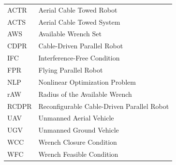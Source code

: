 \begin{tabular}{l l}
   ACTR & Aerial Cable Towed Robot \\
   ACTS & Aerial Cable Towed System \\
   AWS   & Available Wrench Set \\
   CDPR & Cable-Driven Parallel Robot \\
   IFC & Interference-Free Condition \\
   FPR & Flying Parallel Robot \\
   NLP & Nonlinear Optimization Problem \\
   rAW  & Radius of the Available Wrench \\
   RCDPR & Reconfigurable Cable-Driven Parallel Robot \\
   UAV  & Unmanned Aerial Vehicle \\
   UGV  & Unmanned Ground Vehicle \\
   WCC & Wrench Closure Condition \\
   WFC  & Wrench Feasible Condition \\
\end{tabular}

